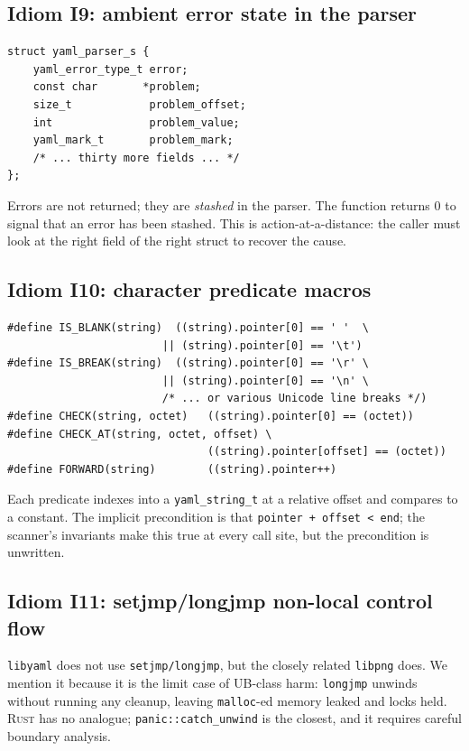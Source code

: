 \documentclass[12pt]{article}
\newcommand{\rust}{\textnormal{\textsc{Rust}}}
\newcommand{\libyaml}{\texttt{libyaml}}
\theoremstyle{definition}
\theoremstyle{remark}
\begin{document}
\subsection{Idiom I9: ambient error state in the parser}
\label{idiom:error}
\begin{lstlisting}[style=cstyle]
struct yaml_parser_s {
    yaml_error_type_t error;
    const char       *problem;
    size_t            problem_offset;
    int               problem_value;
    yaml_mark_t       problem_mark;
    /* ... thirty more fields ... */
};
\end{lstlisting}
Errors are not returned; they are \emph{stashed} in the parser. The function returns 0 to signal that an error has been stashed. This is action-at-a-distance: the caller must look at the right field of the right struct to recover the cause.

\subsection{Idiom I10: character predicate macros}
\label{idiom:predicate}
\begin{lstlisting}[style=cstyle]
#define IS_BLANK(string)  ((string).pointer[0] == ' '  \
                        || (string).pointer[0] == '\t')
#define IS_BREAK(string)  ((string).pointer[0] == '\r' \
                        || (string).pointer[0] == '\n' \
                        /* ... or various Unicode line breaks */)
#define CHECK(string, octet)   ((string).pointer[0] == (octet))
#define CHECK_AT(string, octet, offset) \
                               ((string).pointer[offset] == (octet))
#define FORWARD(string)        ((string).pointer++)
\end{lstlisting}
Each predicate indexes into a \texttt{yaml\_string\_t} at a relative offset and compares to a constant. The implicit precondition is that \texttt{pointer + offset < end}; the scanner's invariants make this true at every call site, but the precondition is unwritten.

\subsection{Idiom I11: setjmp/longjmp non-local control flow}
\label{idiom:setjmp}
\libyaml{} does not use \texttt{setjmp/longjmp}, but the closely related \texttt{libpng} does. We mention it because it is the limit case of UB-class harm: \texttt{longjmp} unwinds without running any cleanup, leaving \texttt{malloc}-ed memory leaked and locks held. \rust{} has no analogue; \texttt{panic::catch\_unwind} is the closest, and it requires careful boundary analysis.
\end{document}
